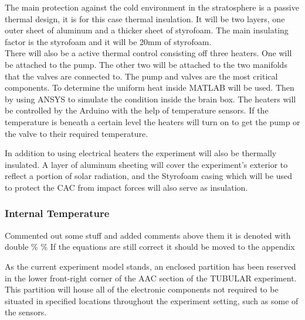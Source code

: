 The main protection against the cold environment in the stratosphere is a passive thermal design, it is for this case thermal insulation. It will be two layers, one outer sheet of aluminum and a thicker sheet of styrofoam. The main insulating factor is the styrofoam and it will be 20mm of styrofoam. \\
There will also be a active thermal control consisting off three heaters. One will be attached to the pump. The other two will be attached to the two manifolds that the valves are connected to. The pump and valves are the most critical components. To determine the uniform heat inside MATLAB will be used. Then by using ANSYS to simulate the condition inside the brain box.
The heaters will be controlled by the Arduino with the help of temperature sensors. If the temperature is beneath a certain level the heaters will turn on to get the pump or the valve to their required temperature.
%

\begin{centering}
In addition to using electrical heaters the experiment will also be thermally insulated. A layer of aluminum sheeting will cover the experiment's exterior to reflect a portion of solar radiation, and the Styrofoam casing which will be used to protect the CAC from impact forces will also serve as insulation. %
\end{centering}



\pagebreak


\raggedbottom

\subsubsection{Internal Temperature}
Commented out some stuff and added comments above them it is denoted with double \% \%
If the equations are still correct it should be moved to the appendix 

As the current experiment model stands, an enclosed partition has been reserved in the lower front-right corner of the AAC section of the TUBULAR experiment. This partition will house all of the electronic components not required to be situated in specified locations throughout the experiment setting, such as some of the sensors. 


